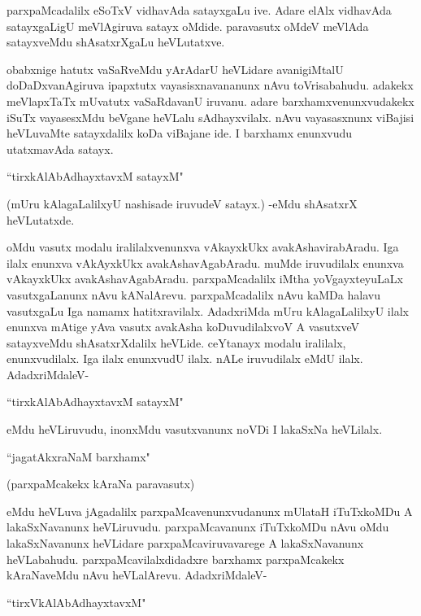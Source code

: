 parxpaMcadalilx eSoTxV vidhavAda satayxgaLu ive. Adare elAlx vidhavAda satayxgaLigU meVlAgiruva satayx oMdide. paravasutx oMdeV meVlAda satayxveMdu shAsatxrXgaLu heVLutatxve.

obabxnige hatutx vaSaRveMdu yArAdarU heVLidare avanigiMtalU doDaDxvanAgiruva ipapxtutx vayasisxnavananunx nAvu toVrisabahudu. adakekx meVlapxTaTx mUvatutx vaSaRdavanU iruvanu. adare barxhamxvenunxvudakekx iSuTx vayasesxMdu beVgane heVLalu sAdhayxvilalx. nAvu vayasasxnunx viBajisi heVLuvaMte satayxdalilx koDa viBajane ide. I barxhamx enunxvudu utatxmavAda satayx. 

 \begin{shloka}
 ``tirxkAlAbAdhayxtavxM satayxM"
 \end{shloka}

(mUru kAlagaLalilxyU nashisade iruvudeV satayx.) -eMdu shAsatxrX heVLutatxde. 


oMdu vasutx modalu iralilalxvenunxva vAkayxkUkx avakAshavirabAradu. Iga ilalx enunxva vAkAyxkUkx avakAshavAgabAradu. muMde iruvudilalx enunxva vAkayxkUkx avakAshavAgabAradu. parxpaMcadalilx iMtha yoVgayxteyuLaLx vasutxgaLanunx nAvu kANalArevu. parxpaMcadalilx nAvu kaMDa halavu vasutxgaLu Iga namamx hatitxravilalx. AdadxriMda mUru kAlagaLalilxyU ilalx enunxva mAtige yAva vasutx avakAsha koDuvudilalxvoV A vasutxveV satayxveMdu shAsatxrXdalilx heVLide. ceYtanayx modalu iralilalx, enunxvudilalx. Iga ilalx enunxvudU ilalx. nALe iruvudilalx eMdU ilalx. AdadxriMdaleV-

\begin{shloka}
``tirxkAlAbAdhayxtavxM satayxM"
\end{shloka}

eMdu heVLiruvudu, inonxMdu vasutxvanunx noVDi I lakaSxNa heVLilalx.

\begin{shloka}
``jagatAkxraNaM barxhamx"
\end{shloka}

(parxpaMcakekx kAraNa paravasutx)

eMdu heVLuva jAgadalilx parxpaMcavenunxvudanunx mUlataH iTuTxkoMDu A lakaSxNavanunx heVLiruvudu. parxpaMcavanunx iTuTxkoMDu nAvu oMdu lakaSxNavanunx heVLidare parxpaMcaviruvavarege A lakaSxNavanunx heVLabahudu. parxpaMcavilalxdidadxre barxhamx parxpaMcakekx kAraNaveMdu nAvu heVLalArevu. AdadxriMdaleV-


\begin{shloka}
``tirxVkAlAbAdhayxtavxM"
\end{shloka}

